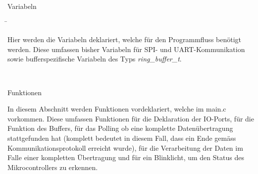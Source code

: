 \begin{tabbing}
\parbox[t]{.3\textwidth}{

Variabeln

} \=\parbox[t]{.7\textwidth}{

Hier werden die Variabeln deklariert, welche für den Programmfluss benötigt werden. Diese umfassen bisher Variabeln für SPI- und UART-Kommunikation sowie bufferspezifische Variabeln des Typs \textit{ring\_buffer\_t}.\\
}\\

\parbox[t]{.3\textwidth}{

Funktionen

} \>\parbox[t]{.7\textwidth}{

In diesem Abschnitt werden Funktionen vordeklariert, welche im main.c vorkommen. Diese umfassen Funktionen für die Deklaration der IO-Ports, für die Funktion des Buffers, für das Polling ob eine komplette Datenübertragung stattgefunden hat (komplett bedeutet in diesem Fall, dass ein Ende gemäss Kommunikationsprotokoll erreicht wurde), für die Verarbeitung der Daten im Falle einer kompletten Übertragung und für ein Blinklicht, um den Status des Mikrocontrollers zu erkennen.
}


\end{tabbing}
